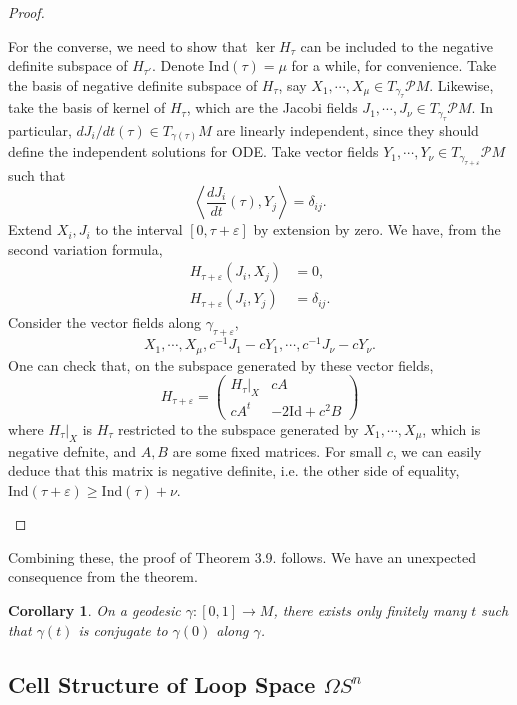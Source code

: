 \documentclass{article}
\newtheorem{corollary}[theorem]{Corollary}
\newcommand{\ep}{\varepsilon}
\newcommand{\il}{\langle}
\newcommand{\ir}{\rangle}
\newcommand{\Om}{\Omega}
\newcommand{\PM}{\mathcal{P}M}
\newcommand{\g}{\gamma}
\newcommand{\Ind}{\mathrm{Ind}}
\newcommand{\Id}{\mathrm{Id}}
\begin{document}
\begin{proof}
\begin{enumerate}
		For the converse, we need to show that $\ker H_\tau$ can be included to the negative definite subspace of $H_{\tau'}$.
		Denote $\Ind(\tau)=\mu$ for a while, for convenience.
		Take the basis of negative definite subspace of $H_\tau$, say $X_1,\cdots,X_\mu\in T_{\g_\tau}\PM$.
		Likewise, take the basis of kernel of $H_\tau$, which are the Jacobi fields $J_1,\cdots,J_\nu\in T_{\g_\tau}\PM$.
		In particular, $dJ_i/dt(\tau)\in T_{\g(\tau)}M$ are linearly independent, since they should define the independent solutions for ODE.
		Take vector fields $Y_1,\cdots,Y_\nu\in T_{\g_{\tau+\ep}}\PM$ such that
			$$\left\il\frac{dJ_i}{dt}(\tau),Y_j\right\ir=\delta_{ij}.$$
		Extend $X_i,J_i$ to the interval $[0,\tau+\ep]$ by extension by zero.
		We have, from the second variation formula,
			$$\begin{aligned}
			H_{\tau+\ep}(J_i,X_j)&=0,\\
			H_{\tau+\ep}(J_i,Y_j)&=\delta_{ij}.
			\end{aligned}$$
		Consider the vector fields along $\g_{\tau+\ep}$,
			$$X_1,\cdots,X_\mu,c^{-1}J_1-cY_1,\cdots,c^{-1}J_\nu-cY_\nu.$$
		One can check that, on the subspace generated by these vector fields,
			$$H_{\tau+\ep}=\left(\begin{array}{cc}
				H_\tau|_{X}	&cA\\
				cA^t&	-2\Id+c^2B
				\end{array}\right)$$
		where $H_\tau|_X$ is $H_\tau$ restricted to the subspace generated by $X_1,\cdots,X_\mu$, which is negative defnite, and $A,B$ are some fixed matrices.
		For small $c$, we can easily deduce that this matrix is negative definite, i.e. the other side of equality, $\Ind(\tau+\ep)\geq\Ind(\tau)+\nu$.
		\end{enumerate}
		\end{proof}

Combining these, the proof of Theorem 3.9. follows.
We have an unexpected consequence from the theorem.
	\begin{corollary}\rm
	On a geodesic $\g:[0,1]\to M$, there exists only finitely many $t$ such that $\g(t)$ is conjugate to $\g(0)$ along $\g$.
	\end{corollary}





\subsection{Cell Structure of Loop Space $\Om S^n$}
\end{document}
